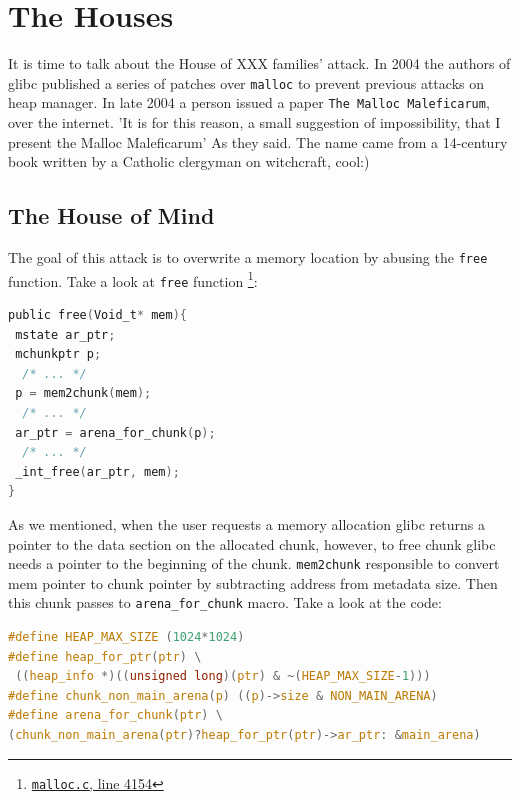 \documentclass{masterthesis}
\newcommand*\libc{glibc}
\newcommand*\mallocc{\lstinline{malloc}}
\begin{document}
\section{The Houses}

It is time to talk about the House of XXX families' attack. In 2004 the authors of \libc{} published a series of patches over \mallocc{} to prevent previous attacks on heap manager. In late 2004 a person issued a paper \lstinline{The Malloc Maleficarum}, over the internet. 'It is for this reason, a small suggestion of impossibility, that I present the Malloc Maleficarum' As they said. The name came from a 14-century book written by a Catholic clergyman on witchcraft, cool:)

\subsection{The House of Mind}
The goal of this attack is to overwrite a memory location by abusing the \lstinline{free} function. Take a look at \lstinline{free} function \footnote{\href{https://sourceware.org/git/?p=glibc.git;a=blob;f=malloc/malloc.c;h=f7cd29bc2f93e1082ee77800bd64a4b2a2897055;hb=9ea3686266dca3f004ba874745a4087a89682617\#l4154}{\texttt{malloc.c}, line 4154}}:
\begin{lstlisting}[language=c,frame=tlrb]
public free(Void_t* mem){
 mstate ar_ptr;
 mchunkptr p;
  /* ... */
 p = mem2chunk(mem);
  /* ... */
 ar_ptr = arena_for_chunk(p);
  /* ... */
 _int_free(ar_ptr, mem);
}
 \end{lstlisting}
As we mentioned, when the user requests a memory allocation \libc{} returns a pointer to the data section on the allocated chunk, however, to free chunk \libc{} needs a pointer to the beginning of the chunk. \lstinline{mem2chunk} responsible to convert mem pointer to chunk pointer by subtracting address from metadata size. Then this chunk passes to \lstinline{arena_for_chunk} macro. Take a look at the code:

\begin{lstlisting}[language=c,frame=tlrb]
#define HEAP_MAX_SIZE (1024*1024)
#define heap_for_ptr(ptr) \
 ((heap_info *)((unsigned long)(ptr) & ~(HEAP_MAX_SIZE-1)))
#define chunk_non_main_arena(p) ((p)->size & NON_MAIN_ARENA)
#define arena_for_chunk(ptr) \
(chunk_non_main_arena(ptr)?heap_for_ptr(ptr)->ar_ptr: &main_arena)
 \end{lstlisting}
\end{document}
